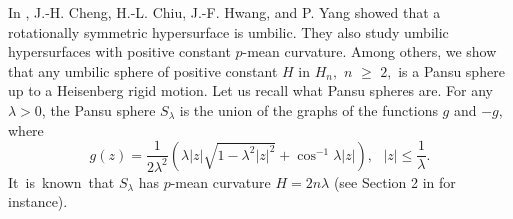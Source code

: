 \documentclass[12pt]{amsart}
\theoremstyle{definition}\newtheorem{exa}[thm]{\sc Example}
\theoremstyle{definition}\newtheorem{de}[thm]{\sc Definition}
\theoremstyle{definition}\newtheorem{rem}[thm]{\sc Remark}
\theoremstyle{definition}\newtheorem{prob}[thm]{\it Problem}
\theoremstyle{definition}\newtheorem{fact}[thm]{\sc Fact}
\theoremstyle{definition}\newtheorem{claim}[thm]{\sc Claim}
\numberwithin{equation}{section}
\begin{document}
In \cite{CCHY1}, J.-H. Cheng, H.-L. Chiu, J.-F. Hwang, and P. Yang showed that a rotationally symmetric hypersurface is umbilic. They also study umbilic hypersurfaces with positive constant $p$-mean curvature. 
Among others, we show that any umbilic sphere of
positive constant $H$ in $H_{n},$ $n$ $\geq $ $2,$ is a Pansu sphere up to a
Heisenberg rigid motion. Let us recall what Pansu spheres are. For any $\lambda>0$, the Pansu sphere $S_{\lambda }$ is the union of the graphs of the functions $g$ and $-g$, where
\begin{equation}
g(z)=\frac{1}{2\lambda ^{2}}\left( \lambda |z|\sqrt{1-\lambda ^{2}|z|^{2}}+\cos ^{-1}{\lambda |z|}\right) ,\ \ \ |z|\leq \frac{1}{\lambda }.
\label{1.6}
\end{equation}
It~is~known~that $S_{\lambda }$ has $p$-mean
curvature $H=2n\lambda$ (see Section 2 in \cite{CCHY1} for instance).
\end{document}
